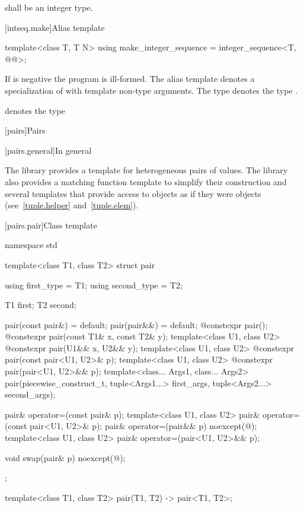 \pnum
{} shall be an integer type.

[intseq.make]{Alias template }

%
\begin{itemdecl}
template<class T, T N>
  using make_integer_sequence = integer_sequence<T, @\seebelow{}@>;
\end{itemdecl}

\begin{itemdescr}
\pnum
If  is negative the program is ill-formed. The alias template
 denotes a specialization of
 with  template non-type arguments.
The type  denotes the type
.
\begin{note}  denotes the type
 \end{note}
\end{itemdescr}

[pairs]{Pairs}

[pairs.general]{In general}

\pnum
The library provides a template for heterogeneous pairs of values.
The library also provides a matching function template to simplify
their construction and several templates that provide access to 
objects as if they were  objects (see~\ref{tuple.helper}
and~\ref{tuple.elem}).%
%
%
%

[pairs.pair]{Class template }

%
\begin{codeblock}
namespace std {
  template<class T1, class T2>
    struct pair {
      using first_type  = T1;
      using second_type = T2;

      T1 first;
      T2 second;

      pair(const pair&) = default;
      pair(pair&&) = default;
      @\EXPLICIT@ constexpr pair();
      @\EXPLICIT@ constexpr pair(const T1& x, const T2& y);
      template<class U1, class U2> @\EXPLICIT@ constexpr pair(U1&& x, U2&& y);
      template<class U1, class U2> @\EXPLICIT@ constexpr pair(const pair<U1, U2>& p);
      template<class U1, class U2> @\EXPLICIT@ constexpr pair(pair<U1, U2>&& p);
      template<class... Args1, class... Args2>
        pair(piecewise_construct_t, tuple<Args1...> first_args, tuple<Args2...> second_args);

      pair& operator=(const pair& p);
      template<class U1, class U2> pair& operator=(const pair<U1, U2>& p);
      pair& operator=(pair&& p) noexcept(@\seebelow@);
      template<class U1, class U2> pair& operator=(pair<U1, U2>&& p);

      void swap(pair& p) noexcept(@\seebelow@);
    };

  template<class T1, class T2>
    pair(T1, T2) -> pair<T1, T2>;
}
\end{codeblock}

